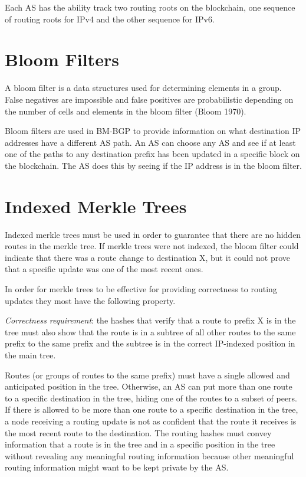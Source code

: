 \documentclass[letterpaper, 10 pt, conference]{ieeeconf}  %
\begin{document}
Each AS has the ability track two routing roots on the blockchain, one sequence of routing roots for IPv4 and the other sequence for IPv6. 

\section{Bloom Filters}
A bloom filter is a data structures used for determining elements in a group. False negatives are impossible and false positives are probabilistic depending on the number of cells and elements in the bloom filter (Bloom 1970). 

Bloom filters are used in BM-BGP to provide information on what destination IP addresses have a different AS path. An AS can choose any AS and see if at least one of the paths to any destination prefix has been updated in a specific block on the blockchain. The AS does this by seeing if the IP address is in the bloom filter. 


\section{Indexed Merkle Trees}
Indexed merkle trees must be used in order to guarantee that there are no hidden routes in the merkle tree. If merkle trees were not indexed, the bloom filter could indicate that there was a route change to destination X, but it could not prove that a specific update was one of the most recent ones. 

In order for merkle trees to be effective for providing correctness to routing updates they most have the following property. 

\textit{Correctness requirement}: the hashes that verify that a route to prefix X is in the tree must also show that the route is in a subtree of all other routes to the same prefix to the same prefix and the subtree is in the correct IP-indexed position in the main tree. 

Routes (or groups of routes to the same prefix) must have a single allowed and anticipated position in the tree. Otherwise, an AS can put more than one route to a specific destination in the tree, hiding one of the routes to a subset of peers. If there is allowed to be more than one route to a specific destination in the tree, a node receiving a routing update is not as confident that the route it receives is the most recent route to the destination. The routing hashes must convey information that a route is in the tree and in a specific position in the tree without revealing any meaningful routing information because other meaningful routing information might want to be kept private by the AS. 
\end{document}
